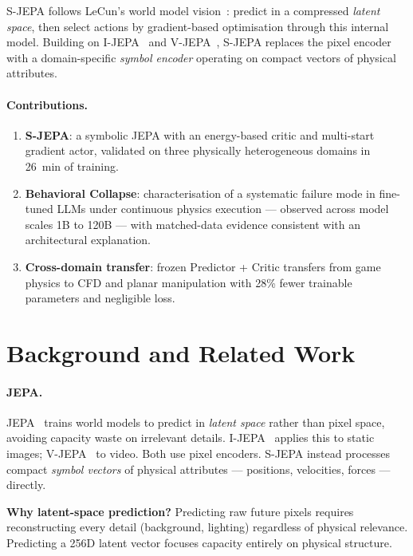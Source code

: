 \documentclass[10pt,twocolumn]{article}
\begin{document}
S-JEPA follows LeCun's world model vision~\citep{lecun2022path}: predict in a compressed
\emph{latent space}, then select actions by gradient-based optimisation through this internal
model. Building on I-JEPA~\citep{assran2023ijepa} and V-JEPA~\citep{bardes2024vjepa},
S-JEPA replaces the pixel encoder with a domain-specific \emph{symbol encoder} operating on
compact vectors of physical attributes.

\paragraph{Contributions.}
\begin{enumerate}[leftmargin=*,topsep=2pt,itemsep=1pt]
\item \textbf{S-JEPA}: a symbolic JEPA with an energy-based critic and multi-start gradient
      actor, validated on three physically heterogeneous domains in 26~min of training.
\item \textbf{Behavioral Collapse}: characterisation of a systematic failure mode in
      fine-tuned LLMs under continuous physics execution — observed across model scales
      1B to 120B — with matched-data evidence consistent with an architectural explanation.
\item \textbf{Cross-domain transfer}: frozen Predictor + Critic transfers from game physics to
      CFD and planar manipulation with 28\% fewer trainable parameters and negligible loss.
\end{enumerate}

\section{Background and Related Work}
\label{sec:background}

\paragraph{JEPA.}
JEPA~\citep{lecun2022path} trains world models to predict in \emph{latent space} rather than
pixel space, avoiding capacity waste on irrelevant details. I-JEPA~\citep{assran2023ijepa}
applies this to static images; V-JEPA~\citep{bardes2024vjepa} to video. Both use pixel
encoders. S-JEPA instead processes compact \emph{symbol vectors} of physical attributes —
positions, velocities, forces — directly.

\begin{conceptbox}
\textbf{Why latent-space prediction?} Predicting raw future pixels requires reconstructing
every detail (background, lighting) regardless of physical relevance. Predicting a 256D
latent vector focuses capacity entirely on physical structure.
\end{conceptbox}
\end{document}
